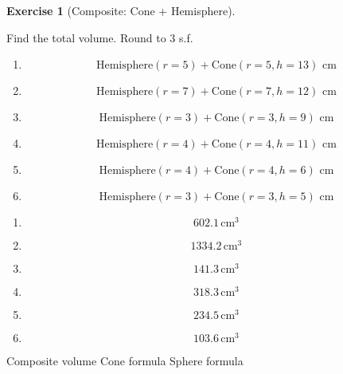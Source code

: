 \documentclass[
  letterpaper,
  DIV=11,
  numbers=noendperiod]{scrreprt}
\theoremstyle{definition}
\newtheorem{exercise}{Exercise}[chapter]
\theoremstyle{remark}
\begin{document}
\begin{exercise}[Composite: Cone +
Hemisphere]\protect\hypertarget{exr-cur-10}{}\label{exr-cur-10}

Find the total volume. Round to 3 s.f.

\begin{enumerate}
\def\labelenumi{\alph{enumi})}
\item
  \[\text{Hemisphere}(r=5)+\text{Cone}(r=5,h=13)\text{ cm}\]
\item
  \[\text{Hemisphere}(r=7)+\text{Cone}(r=7,h=12)\text{ cm}\]
\item
  \[\text{Hemisphere}(r=3)+\text{Cone}(r=3,h=9)\text{ cm}\]
\item
  \[\text{Hemisphere}(r=4)+\text{Cone}(r=4,h=11)\text{ cm}\]
\item
  \[\text{Hemisphere}(r=4)+\text{Cone}(r=4,h=6)\text{ cm}\]
\item
  \[\text{Hemisphere}(r=3)+\text{Cone}(r=3,h=5)\text{ cm}\]
\end{enumerate}

\begin{tcolorbox}[enhanced jigsaw, opacitybacktitle=0.6, coltitle=black, arc=.35mm, colframe=quarto-callout-tip-color-frame, colback=white, bottomrule=.15mm, left=2mm, colbacktitle=quarto-callout-tip-color!10!white, titlerule=0mm, opacityback=0, title=\textcolor{quarto-callout-tip-color}{\faLightbulb}\hspace{0.5em}{🔍 View Solution}, leftrule=.75mm, breakable, rightrule=.15mm, bottomtitle=1mm, toptitle=1mm, toprule=.15mm]

\begin{enumerate}
\def\labelenumi{\alph{enumi})}
\item
  \[602.1\,\text{cm}^{3}\]
\item
  \[1334.2\,\text{cm}^{3}\]
\item
  \[141.3\,\text{cm}^{3}\]
\item
  \[318.3\,\text{cm}^{3}\]
\item
  \[234.5\,\text{cm}^{3}\]
\item
  \[103.6\,\text{cm}^{3}\]
\end{enumerate}

\end{tcolorbox}

{Composite volume} {Cone formula} {Sphere formula}

\end{exercise}
\end{document}
